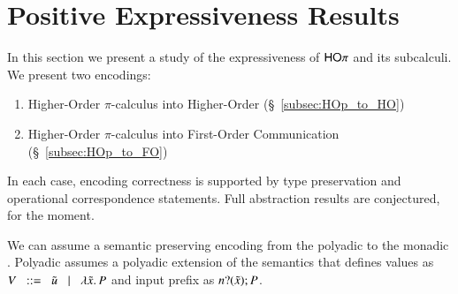 
\section{Positive Expressiveness Results}\label{s:positive}
In this section we present a study of the expressiveness of $\mathsf{HO}\pi$ and its subcalculi. 
We present two encodings:
%
\begin{enumerate}[1.]
	\item Higher-Order $\pi$-calculus into Higher-Order  (\S~\ref{subsec:HOp_to_HO})
	\item Higher-Order $\pi$-calculus into First-Order Communication (\S~\ref{subsec:HOp_to_FO})
\end{enumerate}
%
In each case, encoding correctness is supported by type preservation and operational correspondence statements.
Full abstraction results are conjectured, for the moment.

\begin{remark}
	We can assume a semantic preserving encoding from the polyadic
	\HOp to the monadic \HOp. Polyadic \HOp assumes a polyadic
	extension of the \HOp semantics that defines values as
	$V \;\;::=\;\; \tilde{u} \;\;\;|\;\;\; \lambda \tilde{x}.\,P$
	and input prefix as $n ? (\tilde{x}) ; P$.
\end{remark}

